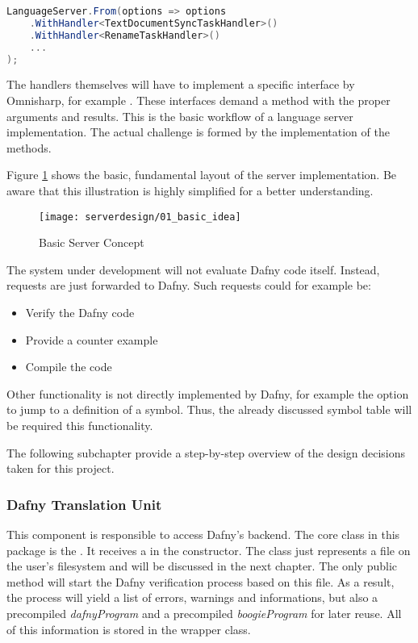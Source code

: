 \begin{lstlisting}[language=csharp, caption={Language Server Initialization}, captionpos=b, label={lst:serverstart}]
LanguageServer.From(options => options
    .WithHandler<TextDocumentSyncTaskHandler>()
    .WithHandler<RenameTaskHandler>()
    ...
);
\end{lstlisting}

The handlers themselves will have to implement a specific interface by Omnisharp, for example . These interfaces demand a  method with the proper arguments and results. This is the basic workflow of a language server implementation. The actual challenge is formed by the implementation of the  methods.

Figure \ref{fig:server_basic_idea} shows the basic, fundamental layout of the server implementation. Be aware that this illustration is highly simplified for a better understanding.

\begin{figure}[H]
    \centering
    \texttt{[image: serverdesign/01\_basic\_idea]}
    \caption{Basic Server Concept}
    \label{fig:server_basic_idea}
\end{figure}

The system under development will not evaluate Dafny code itself. Instead, requests are just forwarded to Dafny. Such requests could for example be:
\begin{itemize}
    \item Verify the Dafny code
    \item Provide a counter example
    \item Compile the code
\end{itemize}

Other functionality is not directly implemented by Dafny, for example the option to jump to a definition of a symbol. Thus, the already discussed symbol table will be required this functionality.

The following subchapter provide a step-by-step overview of the design decisions taken for this project.

\subsubsection{Dafny Translation Unit}
This component is responsible to access Dafny's backend. The core class in this package is the . It receives a  in the constructor. The class  just represents a file on the user's filesystem and will be discussed in the next chapter. The only public method  will start the Dafny verification process based on this file. As a result, the process will yield a list of errors, warnings and informations, but also a precompiled \textit{dafnyProgram} and a precompiled \textit{boogieProgram} for later reuse. All of this information is stored in the  wrapper class.

